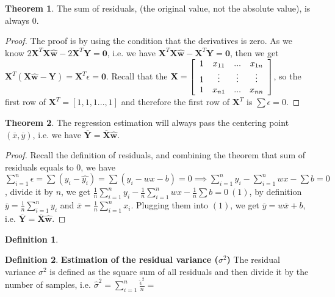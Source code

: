 \documentclass{article}
\theoremstyle{definition}
\newtheorem{defi}{Definition}[subsection]
\newtheorem{theorem}{Theorem}[subsection]
\begin{document}
\begin{theorem}
The sum of residuals, (the original value, not the absolute value), is always 0.
\begin{proof}
The proof is by using the condition that the derivatives is zero. As we know $2\textbf{X}^{T}\textbf{X}\hat{\textbf{w}}-2\textbf{X}^{T}\textbf{Y}=\textbf{0}$, i.e. we have $\textbf{X}^{T}\textbf{X}\hat{\textbf{w}}-\textbf{X}^{T}\textbf{Y}=\textbf{0}$, then we get $\textbf{X}^{T}(\textbf{X}\hat{\textbf{w}}-\textbf{Y})=\textbf{X}^{T}\epsilon=\textbf{0}$. Recall that the $\textbf{X}=\left[ {\begin{array}{*{20}c}
   1 & x_{11} & ...  & x_{1n}\\
   1 & \vdots  & \vdots & \vdots \\
   1 & x_{n1} & ... &x_{nn}\\
 \end{array} } \right]$, so the first row of $\textbf{X}^{T}=[1,1,1...,1]$ and therefore the first row of $\textbf{X}^T$ is $\sum{\epsilon}=0$.
\end{proof}
\end{theorem}

\begin{theorem}
The regression estimation will always pass the centering point $(\overline{x},\overline{y})$, i.e. we have $\overline{\textbf{Y}}=\overline{\textbf{X}}\hat{\textbf{w}}$.
\begin{proof}
Recall the definition of residuals, and combining the theorem that sum of residuals equals to 0, we have $\sum_{i=1}^{n}\epsilon=\sum(y_i-\hat{y_i})=\sum(y_i-wx-b)=0\implies \sum_{i=1}^{n}y_i-\sum_{i=1}^{n}wx-\sum b=0$, divide it by $n$, we get $\frac{1}{n}\sum_{i=1}^{n}y_i-\frac{1}{n}\sum_{i=1}^{n}wx -\frac{1}{n}\sum b=0\:(1)$, by definition $\overline{y}=\frac{1}{n}\sum_{i=1}^{n}y_i$ and $\overline{x}=\frac{1}{n}\sum_{i=1}^{n}x_i$. Plugging them into $(1)$, we get $\overline{y}=w\overline{x}+b$, i.e. $\overline{\textbf{Y}}=\overline{\textbf{X}}\hat{\textbf{w}}$.
\end{proof}
\end{theorem}

\begin{defi}

\end{defi}

\begin{defi}
\textbf{Estimation of the residual variance ($\sigma^2$)} The residual variance $\sigma^2$ is defined as the square sum of all residuals and then divide it by the number of samples, i.e. $\hat{\sigma}^2=\sum_{i=1}^{n}\frac{\hat{\epsilon}^2}{n}=$
\end{defi}
\end{document}

